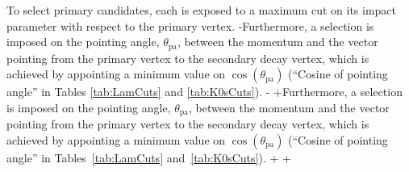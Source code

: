  To select primary candidates, each \Vz is exposed to a maximum cut on its impact parameter with respect to the primary vertex.
-Furthermore, a selection is imposed on the pointing angle, $\theta_{\mathrm{pa}}$, between the \Vz momentum and the vector pointing from the primary vertex to the secondary \Vz decay vertex, which is achieved by appointing a minimum value on $\cos(\theta_{\mathrm{pa}})$ (``Cosine of pointing angle'' in Tables \ref{tab:LamCuts} and \ref{tab:K0sCuts}).
-
+Furthermore, a selection is imposed on the pointing angle, $\theta_{\mathrm{pa}}$, between the \Vz momentum and the vector pointing from the primary vertex to the secondary \Vz decay vertex, which is achieved by appointing a minimum value on $\cos(\theta_{\mathrm{pa}})$ (``Cosine of pointing angle'' in Tables~\ref{tab:LamCuts} and~\ref{tab:K0sCuts}).
+
+\begin{comment}
 In order to remove the contamination to the \LamALam and \Ks samples due to misidentification of the protons and pions for each \Vz, the mass assuming different identities (\Lam, \ALam, \Ks)\footnote[1]
 {
-For the misidentification cuts, the mass assuming \Ks hypothesis ($m_{\mathrm{inv,~ K^{0}_{S}~ hyp.}}$) is calculated assuming $\pi^{+}\pi^{-}$ daughters, the mass assuming \Lam hypothesis ($m_{\mathrm{inv,~ \Lambda~ hyp.}}$) is calculated assuming p$\pi^{-}$ daughters, and the mass assuming \ALam hypothesis ($m_{\mathrm{inv,~ \overline{\Lambda}~ hyp.}}$) is calculated assuming $\overline{p}\pi^{+}$ daughters. 
-Additionally, $m_{\mathrm{PDG,\,K^{0}_{S}}}$ and $m_{\mathrm{PDG,\,\Lambda(\overline{\Lambda})}}$ denote the particle masses of the \Ks and \LamALam, respectively, as recorded by the Particle Data Group \cite{Patrignani:2016xqp}.
+For the misidentification cuts, the mass assuming \Ks hypothesis ($m_{\mathrm{inv,~ K^{0}_{S}~ hyp.}}$) is calculated assuming $\pi^{+}\pi^{-}$ daughters, the mass assuming \Lam hypothesis ($m_{\mathrm{inv,~ \Lambda~ hyp.}}$) is calculated assuming p$\pi^{-}$ daughters, and the mass assuming \ALam hypothesis ($m_{\mathrm{inv,~ \overline{\Lambda}~ hyp.}}$) is calculated assuming $\overline{\mathrm{p}}\pi^{+}$ daughters. 
+Additionally, $m_{\mathrm{PDG,\,K^{0}_{S}}}$ and $m_{\mathrm{PDG,\,\Lambda(\overline{\Lambda})}}$ denote the particle masses of the \Ks and \LamALam, respectively, as recorded by the Particle Data Group~\cite{PhysRevD.98.030001}.
 }
 is calculated and utilized in a set of misidentification cuts.
 For \LamALam selection, a candidate is assumed to be misidentified and is rejected if all of the following criteria are satisfied:
+\end{comment}
